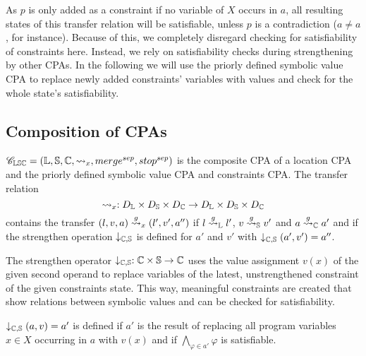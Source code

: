 As $p$ is only added as a constraint if no variable of $X$ occurs in $a$, all resulting states of this transfer relation will be satisfiable, unless $p$ is a contradiction ($a \neq a$, for instance). Because of this, we completely disregard checking for satisfiability of constraints here.
Instead, we rely on satisfiability checks during strengthening by other CPAs.
In the following we will use the priorly defined symbolic value CPA to replace newly added constraints' variables with values and check for the whole state's satisfiability.

\subsection{Composition of CPAs}
$\mathscr{C}_{\mathbb{L}\mathbb{S}\mathbb{C}} = (\mathbb{L}, \mathbb{S}, \mathbb{C}, \rightsquigarrow_x, merge^{sep}, stop^{sep})$ is the composite CPA of a location CPA and the priorly defined symbolic value CPA and constraints CPA.
The transfer relation \[\rightsquigarrow_x : D_{\mathbb{L}} \times D_{\mathbb{S}} \times D_{\mathbb{C}} \rightarrow D_{\mathbb{L}} \times D_{\mathbb{S}} \times D_{\mathbb{C}}\] contains
the transfer $(l, v, a) \overset{g}{\rightsquigarrow}_x (l', v', a'')$ if 
            $l \overset{g}{\rightsquigarrow}_{\mathbb{L}} l'$,
            $v \overset{g}{\rightsquigarrow}_{\mathbb{S}} v'$ and
            $a \overset{g}{\rightsquigarrow}_{\mathbb{C}} a'$ and
            if the strengthen operation $\downarrow_{\mathbb{C}, \mathbb{S}}$ is defined for $a'$ and $v'$ with
            $\downarrow_{\mathbb{C}, \mathbb{S}} (a', v') = a''$.

The strengthen operator $\downarrow_{\mathbb{C}, \mathbb{S}} : \mathbb{C} \times \mathbb{S} \rightarrow \mathbb{C}$ uses the value assignment $v(x)$ of the given second operand to replace variables of the latest, unstrengthened constraint of the given constraints state. This way, meaningful constraints are created that show relations between symbolic values and can be checked for satisfiability.

$\downarrow_{\mathbb{C}, \mathbb{S}} (a, v) = a'$ is defined if $a'$ is the result of replacing all program variables $x \in X$ occurring in $a$ with $v(x)$ and if $\displaystyle\bigwedge_{\varphi \in a'} \varphi$ is satisfiable.

